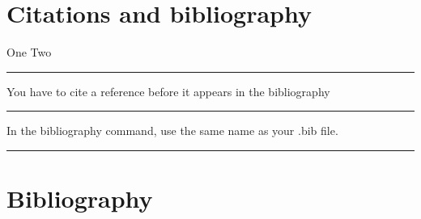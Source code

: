 \documentclass[12pt]{article}
\newcommand{\inOut}[1]{#1}                %
\begin{document}
\section{Citations and bibliography}\label{secCit}

\begin{example} \label{expCite1}
\inOut{One \cite{Aa01} Two \cite{LL01}}
\end{example}\hrule

\begin{remark} \label{remCite1}
  You have to cite a reference before it appears in the bibliography
\end{remark}\hrule

\begin{remark} \label{remCite2}
  In the bibliography command, use the same name as your .bib file.
\end{remark}\hrule

\section{Bibliography}\label{secBib}
\newpage

\end{document}
